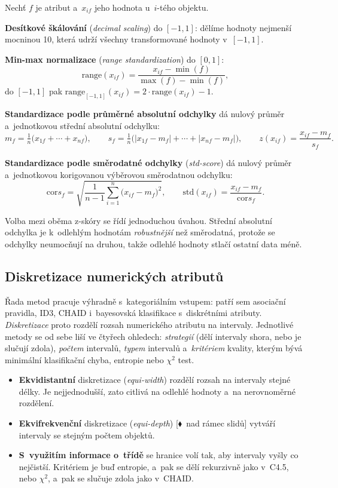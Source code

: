 \documentclass[11pt,a4paper]{article}
\theoremstyle{definition}
\newcommand{\mimo}{\textcolor{markcol}{\textsf{\footnotesize[$\blacklozenge$~nad rámec slidů]}}}
\begin{document}
\begin{defbox}
Nechť $f$ je atribut a~$x_{if}$ jeho hodnota u~$i$-tého objektu.

\textbf{Desítkové škálování} (\emph{decimal scaling}) do $[-1,1]$: dělíme hodnoty nejmenší
mocninou 10, která udrží všechny transformované hodnoty v~$[-1,1]$.

\textbf{Min-max normalizace} (\emph{range standardization}) do $[0,1]$:
\[ \mathrm{range}(x_{if})=\frac{x_{if}-\min(f)}{\max(f)-\min(f)}, \]
do $[-1,1]$ pak $\mathrm{range}_{[-1,1]}(x_{if})=2\cdot \mathrm{range}(x_{if})-1$.

\textbf{Standardizace podle průměrné absolutní odchylky} dá nulový průměr a~jednotkovou
střední absolutní odchylku:
\[ m_f=\tfrac1n\big(x_{1f}+\cdots+x_{nf}\big),\qquad
s_f=\tfrac1n\big(|x_{1f}-m_f|+\cdots+|x_{nf}-m_f|\big),\qquad
z(x_{if})=\frac{x_{if}-m_f}{s_f}. \]

\textbf{Standardizace podle směrodatné odchylky} (\emph{std-score}) dá nulový průměr
a~jednotkovou korigovanou výběrovou směrodatnou odchylku:
\[ \mathrm{cor}s_f=\sqrt{\frac{1}{n-1}\sum_{i=1}^n\big(x_{if}-m_f\big)^2},\qquad
\mathrm{std}(x_{if})=\frac{x_{if}-m_f}{\mathrm{cor}s_f}. \]
\end{defbox}

Volba mezi oběma z-skóry se řídí jednoduchou úvahou. Střední absolutní odchylka je k~odlehlým
hodnotám \emph{robustnější} než směrodatná, protože se odchylky neumocňují na druhou, takže
odlehlé hodnoty stlačí ostatní data méně.

\subsection{Diskretizace numerických atributů}

Řada metod pracuje výhradně s~kategoriálním vstupem: patří sem asociační pravidla, ID3, CHAID
i~bayesovská klasifikace s~diskrétními atributy. \emph{Diskretizace} proto rozdělí rozsah
numerického atributu na intervaly. Jednotlivé metody se od sebe liší ve čtyřech ohledech:
\emph{strategií} (dělí intervaly shora, nebo je slučují zdola), \emph{počtem} intervalů,
\emph{typem} intervalů a~\emph{kritériem} kvality, kterým bývá minimální klasifikační chyba,
entropie nebo $\chi^2$ test.

\begin{itemize}
\item \textbf{Ekvidistantní} diskretizace (\emph{equi-width}) rozdělí rozsah na intervaly
      stejné délky. Je nejjednodušší, zato citlivá na odlehlé hodnoty a~na nerovnoměrné
      rozdělení.
\item \textbf{Ekvifrekvenční} diskretizace (\emph{equi-depth}) \mimo{} vytváří intervaly se
      stejným počtem objektů.
\item \textbf{S~využitím informace o~třídě} se hranice volí tak, aby intervaly vyšly co
      nejčistší. Kritériem je buď entropie, a~pak se dělí rekurzivně jako v~C4.5, nebo
      $\chi^2$, a~pak se slučuje zdola jako v~CHAID.
\end{itemize}
\end{document}
